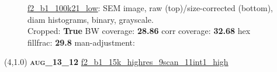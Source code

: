 \begin{figure}[h!]
\label{semimg20}
\caption*{\hyperlink{covtableaug_13_12}{\color{blue} \small \ttfamily f2\_b1\_100k21\_low}: SEM image, raw (top)/size-corrected (bottom), diam histograms, binary, grayscale.\\Cropped: {\bf True} \;\; BW coverage: {\bf 28.86} \:\: corr coverage: {\bf 32.68} \:\: hex fillfrac: {\bf 29.8} \:\: man-adjustment: {\bf \color{blue}{Yes}}}
\end{figure}
\newpage

\begin{textblock}{5}(4,1.0)
{\bf \textsc{aug\_13\_12}}
\hspace{4.5cm}
\hyperlink{covtableaug_13_12}{\color{blue} \large \ttfamily f2\_b1\_15k\_highres\_9scan\_11int1\_high}
\end{textblock}

